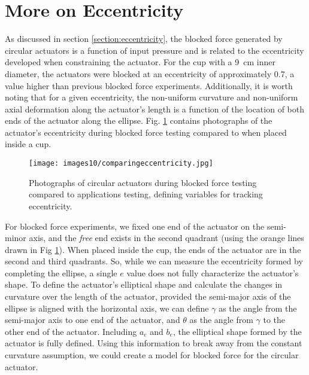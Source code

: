 \clearpage
\section{More on Eccentricity}

As discussed in section \ref{section:eccentricity}, the blocked force generated by circular actuators is a function of input pressure and is related to the eccentricity developed when constraining the actuator. For the cup with a 9~cm inner diameter, the actuators were blocked at an eccentricity of approximately 0.7, a value higher than previous blocked force experiments. Additionally, it is worth noting that for a given eccentricity, the non-uniform curvature and non-uniform axial deformation along the actuator's length is a function of the location of both ends of the actuator along the ellipse. Fig. \ref{fig:comparingeccentricity} contains photographs of the actuator's eccentricity during blocked force testing compared to when placed inside a cup. 

\begin{figure}[!ht]
    \centering
     \texttt{[image: images10/comparingeccentricity.jpg]}
    \caption{Photographs of circular actuators during blocked force testing compared to applications testing, defining variables for tracking eccentricity. }
    \label{fig:comparingeccentricity}
\end{figure}

For blocked force experiments, we fixed one end of the actuator on the semi-minor axis, and the \emph{free} end exists in the second quadrant (using the orange lines drawn in Fig \ref{fig:comparingeccentricity}). When placed inside the cup, the ends of the actuator are in the second and third quadrants. So, while we can measure the eccentricity formed by completing the ellipse, a single $e$ value does not fully characterize the actuator's shape. To define the actuator's elliptical shape and calculate the changes in curvature over the length of the actuator, provided the semi-major axis of the ellipse is aligned with the horizontal axis, we can define $\gamma$ as the angle from the semi-major axis to one end of the actuator, and $\theta$ as the angle from $\gamma$ to the other end of the actuator. Including $a_e$ and $b_e$, the elliptical shape formed by the actuator is fully defined. Using this information to break away from the constant curvature assumption, we could create a model for blocked force for the circular actuator. 
